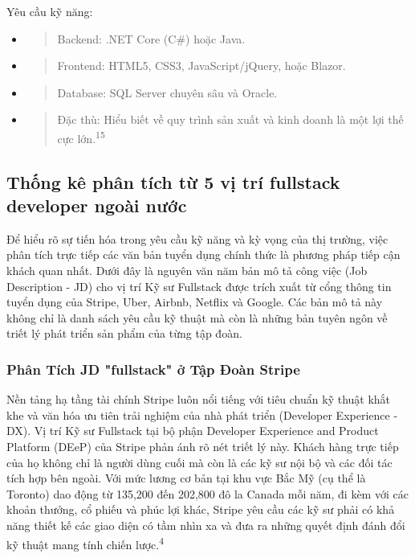 \documentclass[12pt,a4paper]{article}
\begin{document}
Yêu cầu kỹ năng:
\begin{itemize}
\item
  \begin{quote}
  Backend: .NET Core (C\#) hoặc Java.
  \end{quote}
\item
  \begin{quote}
  Frontend: HTML5, CSS3, JavaScript/jQuery, hoặc Blazor.
  \end{quote}
\item
  \begin{quote}
  Database: SQL Server chuyên sâu và Oracle.
  \end{quote}
\item
  \begin{quote}
  Đặc thù: Hiểu biết về quy trình sản xuất và kinh doanh là một lợi thế cực lớn.\textsuperscript{15}
  \end{quote}
\end{itemize}

\subsection{Thống kê phân tích từ 5 vị trí fullstack developer ngoài nước}
Để hiểu rõ sự tiến hóa trong yêu cầu kỹ năng và kỳ vọng của thị trường,
việc phân tích trực tiếp các văn bản tuyển dụng chính thức là phương
pháp tiếp cận khách quan nhất. Dưới đây là nguyên văn năm bản mô tả công
việc (Job Description - JD) cho vị trí Kỹ sư Fullstack được trích xuất
từ cổng thông tin tuyển dụng của Stripe, Uber, Airbnb, Netflix và
Google. Các bản mô tả này không chỉ là danh sách yêu cầu kỹ thuật mà còn
là những bản tuyên ngôn về triết lý phát triển sản phẩm của từng tập
đoàn.

\subsubsection{Phân Tích JD "fullstack" ở Tập Đoàn Stripe}

Nền tảng hạ tầng tài chính Stripe luôn nổi tiếng với tiêu chuẩn kỹ thuật
khắt khe và văn hóa ưu tiên trải nghiệm của nhà phát triển (Developer
Experience - DX). Vị trí Kỹ sư Fullstack tại bộ phận Developer
Experience and Product Platform (DEeP) của Stripe phản ánh rõ nét triết
lý này. Khách hàng trực tiếp của họ không chỉ là người dùng cuối mà còn
là các kỹ sư nội bộ và các đối tác tích hợp bên ngoài. Với mức lương cơ
bản tại khu vực Bắc Mỹ (cụ thể là Toronto) dao động từ 135,200 đến
202,800 đô la Canada mỗi năm, đi kèm với các khoản thưởng, cổ phiếu và
phúc lợi khác, Stripe yêu cầu các kỹ sư phải có khả năng thiết kế các
giao diện có tầm nhìn xa và đưa ra những quyết định đánh đổi kỹ thuật
mang tính chiến lược.\textsuperscript{4}
\end{document}
